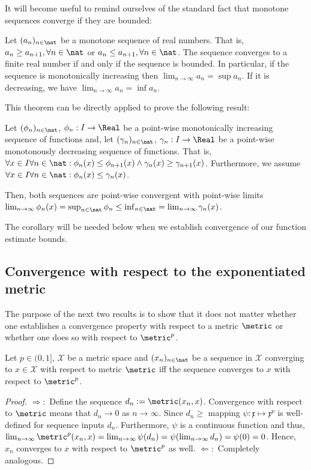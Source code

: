 It will become useful to remind ourselves of the standard fact that monotone sequences converge if they are bounded:
\begin{thm}
Let $(a_n)_{n \in \nat}$ be a monotone sequence of real numbers. That is, $a_n \geq a_{n+1}, \forall n \in \nat$ or $a_n \leq a_{n+1}, \forall n \in \nat$. The sequence converges to a finite real number if and only if the sequence is bounded. In particular, if the sequence is monotonically increasing then $\lim_{n \to \infty} a_n = \sup a_n$. If it is decreasing, we have $\lim_{n \to \infty} a_n = \inf a_n$.
\end{thm}
This theorem can be directly applied to prove the following result:
\begin{cor}
\label{cor:monseqfctsencl}
Let $(\phi_n)_{n \in \nat}$, $\phi_n : I \to \Real$ be a point-wise monotonically increasing sequence of functions and, let $(\gamma_n)_{n \in \nat}$, $\gamma_n : I \to \Real$ be a point-wise monotonously decreasing sequence of functions. That is, $\forall x \in I \forall n \in \nat: \phi_n(x) \leq \phi_{n+1}(x) \wedge \gamma_n(x) \geq \gamma_{n+1}(x) $. Furthermore, we assume $\forall x \in I \forall n \in \nat: \phi_n(x) \leq \gamma_{n}(x)$. 

Then, both sequences are point-wise convergent with point-wise limits 
$\lim_{n \to \infty} \phi_n (x) = \sup_{n \in \nat} \phi_n \leq \inf_{n \in \nat} = \lim_{n \to \infty} \gamma_n (x) $.
\end{cor}
The corollary will be needed below when we establish convergence of our function estimate bounds.

\subsection{Convergence with respect to the exponentiated metric}
\label{sec:unifconvhoeldermetricequivmetricunifconv}
The purpose of the next two results is to show that it does not matter whether one establishes a convergence property with respect to a metric $\metric$ or whether one does so with respect to $\metric^p$.
\begin{lem}\label{lem:hoeldermetricconv}
Let $p \in (0,1]$, $\mathcal X$ be a metric space and $(x_n)_{n \in \nat}$ be a sequence in $\mathcal X$ converging to $x \in \mathcal X$ with respect to metric $\metric$ iff the sequence converges to $x$ with respect to $\metric^p$.

\begin{proof}
$\Rightarrow:$
Define the sequence $d_n :=  \metric(x_n,x) $.
Convergence with respect to $\metric$ means that $d_n \to 0$ as $n \to \infty$. Since $d_n \geq$ mapping $ \psi: \mathfrak x \mapsto \mathfrak x^p$ is well-defined for sequence inputs $d_n$. Furthermore, $\psi$ is a continuous function and thus, 
$\lim_{n \to \infty} \metric^p(x_n,x) = \lim_{n \to \infty} \psi(d_n) =  \psi( \lim_{n \to \infty} d_n) = \psi (0)  =0$.
Hence, $x_n$ converges to $x$ with respect to $\metric^p$ as well.
$\Leftarrow:$ Completely analogous.

\end{proof}  
\end{lem}

